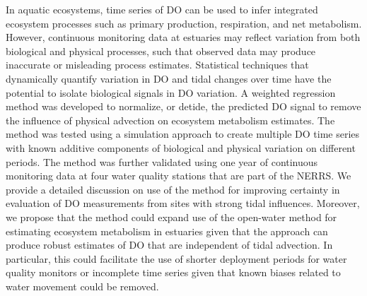 In aquatic ecosystems, time series of \ac{DO} can be used to infer integrated ecosystem processes such as primary production, respiration, and net metabolism.  However, continuous monitoring data at estuaries may reflect variation from both biological and physical processes, such that observed data may produce inaccurate or misleading process estimates.  Statistical techniques that dynamically quantify variation in \ac{DO} and tidal changes over time have the potential to isolate biological signals in \ac{DO} variation.  A weighted regression method was developed to normalize, or detide, the predicted \ac{DO} signal to remove the influence of physical advection on ecosystem metabolism estimates.  The method was tested using a simulation approach to create multiple \ac{DO} time series with known additive components of biological and physical variation on different periods.  The method was further validated using one year of continuous monitoring data at four water quality stations that are part of the \acl{NERRS}. We provide a detailed discussion on use of the method for improving certainty in evaluation of \ac{DO} measurements from sites with strong tidal influences.  Moreover, we propose that the method could expand use of the open-water method for estimating ecosystem metabolism in estuaries given that the approach can produce robust estimates of \ac{DO} that are independent of tidal advection.  In particular, this could facilitate the use of shorter deployment periods for water quality monitors or incomplete time series given that known biases related to water movement could be removed. 